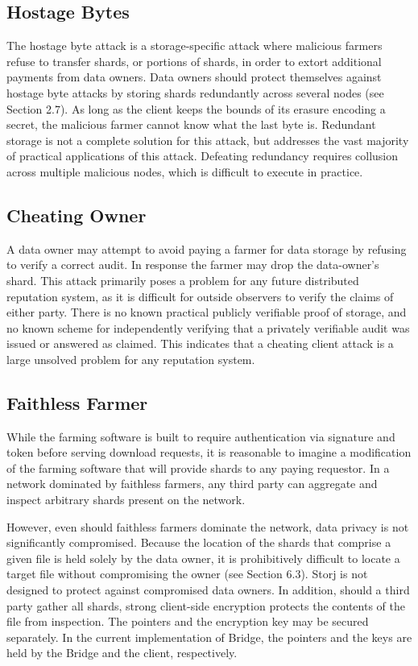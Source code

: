 \documentclass[a4paper,10pt]{article}
\begin{document}
\subsection{Hostage Bytes}
The hostage byte attack is a storage-specific attack where malicious farmers refuse to transfer shards, or portions of shards, in order to extort additional payments from data owners. Data owners should protect themselves against hostage byte attacks by storing shards redundantly across several nodes (see Section 2.7). As long as the client keeps the bounds of its erasure encoding a secret, the malicious farmer cannot know what the last byte is. Redundant storage is not a complete solution for this attack, but addresses the vast majority of practical applications of this attack. Defeating redundancy requires collusion across multiple malicious nodes, which is difficult to execute in practice.

\subsection{Cheating Owner}
A data owner may attempt to avoid paying a farmer for data storage by refusing to verify a correct audit. In response the farmer may drop the data-owner’s shard. This attack primarily poses a problem for any future distributed reputation system, as it is difficult for outside observers to verify the claims of either party. There is no known practical publicly verifiable proof of storage, and no known scheme for independently verifying that a privately verifiable audit was issued or answered as claimed. This indicates that a cheating client attack is a large unsolved problem for any reputation system.

\subsection{Faithless Farmer}
While the farming software is built to require authentication via signature and token before serving download requests, it is reasonable to imagine a modification of the farming software that will provide shards to any paying requestor. In a network dominated by faithless farmers, any third party can aggregate and inspect arbitrary shards present on the network.

However, even should faithless farmers dominate the network, data privacy is not significantly compromised. Because the location of the shards that comprise a given file is held solely by the data owner, it is prohibitively difficult to locate a target file without compromising the owner (see Section 6.3). Storj is not designed to protect against compromised data owners. In addition, should a third party gather all shards, strong client-side encryption protects the contents of the file from inspection. The pointers and the encryption key may be secured separately. In the current implementation of Bridge, the pointers and the keys are held by the Bridge and the client, respectively.
\end{document}
